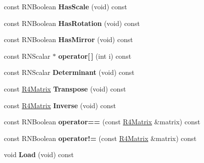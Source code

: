 \begin{DoxyCompactItemize}
\item 
const R\+N\+Boolean {\bfseries Has\+Scale} (void) const \hypertarget{class_r4_matrix_a27f93a57c7d2540030fe91e78c8d5fb5}{}\label{class_r4_matrix_a27f93a57c7d2540030fe91e78c8d5fb5}

\item 
const R\+N\+Boolean {\bfseries Has\+Rotation} (void) const \hypertarget{class_r4_matrix_ab26171ed1b60b2a473e0ff08c22cd831}{}\label{class_r4_matrix_ab26171ed1b60b2a473e0ff08c22cd831}

\item 
const R\+N\+Boolean {\bfseries Has\+Mirror} (void) const \hypertarget{class_r4_matrix_a2823f162bfbb66373893e7ea0e6fcef3}{}\label{class_r4_matrix_a2823f162bfbb66373893e7ea0e6fcef3}

\item 
const R\+N\+Scalar $\ast$ {\bfseries operator\mbox{[}$\,$\mbox{]}} (int i) const \hypertarget{class_r4_matrix_a3fa6ffc9df23827228aa7f3f4fa3a598}{}\label{class_r4_matrix_a3fa6ffc9df23827228aa7f3f4fa3a598}

\item 
const R\+N\+Scalar {\bfseries Determinant} (void) const \hypertarget{class_r4_matrix_a22bd97516f1db2692a9fc82bc8252066}{}\label{class_r4_matrix_a22bd97516f1db2692a9fc82bc8252066}

\item 
const \hyperlink{class_r4_matrix}{R4\+Matrix} {\bfseries Transpose} (void) const \hypertarget{class_r4_matrix_a11c582ac3969a7c84a5cb57770e5a5c8}{}\label{class_r4_matrix_a11c582ac3969a7c84a5cb57770e5a5c8}

\item 
const \hyperlink{class_r4_matrix}{R4\+Matrix} {\bfseries Inverse} (void) const \hypertarget{class_r4_matrix_a8e3feb37679fe84f00f98001b8261ae6}{}\label{class_r4_matrix_a8e3feb37679fe84f00f98001b8261ae6}

\item 
const R\+N\+Boolean {\bfseries operator==} (const \hyperlink{class_r4_matrix}{R4\+Matrix} \&matrix) const \hypertarget{class_r4_matrix_a3cbcabd4d668e6a60baeae4c2364a9f8}{}\label{class_r4_matrix_a3cbcabd4d668e6a60baeae4c2364a9f8}

\item 
const R\+N\+Boolean {\bfseries operator!=} (const \hyperlink{class_r4_matrix}{R4\+Matrix} \&matrix) const \hypertarget{class_r4_matrix_a359732005c1d11eebe75b7c7835d802e}{}\label{class_r4_matrix_a359732005c1d11eebe75b7c7835d802e}

\item 
void {\bfseries Load} (void) const \hypertarget{class_r4_matrix_a5e93e90f84d620a15d1465f765bacd6e}{}\label{class_r4_matrix_a5e93e90f84d620a15d1465f765bacd6e}


\end{DoxyCompactItemize}
